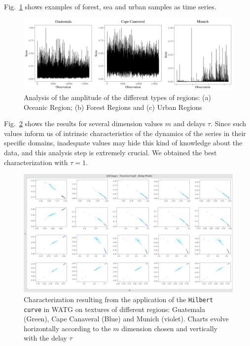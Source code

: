 \documentclass{isprs}
\begin{document}

Fig.~\ref{fig:AmplitudeSAR} shows examples of forest, sea and urban samples as time series.

\begin{figure}[hbt]
	\includegraphics[width=\columnwidth]{Figures/SAR_signal.pdf}
	\caption{Analysis of the amplitude of the different types of regions: (a) Oceanic Region; (b) Forest Regions and (c) Urban Regions}
	\label{fig:AmplitudeSAR}
\end{figure}


Fig.~\ref{fig:Regions} shows the results for several dimension values $m$ and delays $\tau$.
Since such values inform us of intrinsic characteristics of the dynamics of the series in their specific domains, inadequate values may hide this kind of knowledge about the data, and this analysis step is extremely crucial.
We obtained the best characterization with $\tau = 1$.

\begin{figure}
	\centering
	\includegraphics[width=1.05\textwidth]{Figures/transitionGraphHilbert.pdf}
	\caption{Characterization resulting from the application of the \texttt{Hilbert curve} in WATG on textures of different regions: Guatemala (Green), Cape Canaveral (Blue) and Munich (violet). Charts evolve horizontally according to the $m$ dimension chosen and vertically with the delay $\tau$}
	\label{fig:Regions}
\end{figure}
\end{document}
